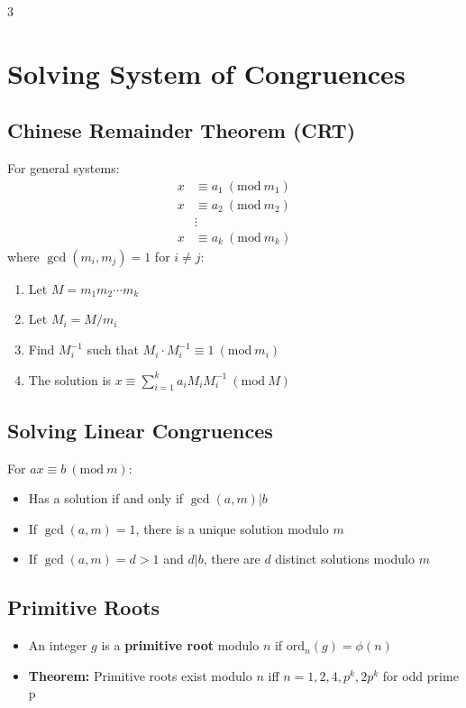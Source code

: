 \documentclass[8,a4paper]{article}
\newcommand{\ord}{\text{ord}}
\newcommand{\Mod}[1]{\ (\mathrm{mod}\ #1)}
\begin{document}
\begin{multicols}{3}
	\section{Solving System of Congruences}

	\subsection{Chinese Remainder Theorem (CRT)}
	For general systems:
	\begin{align*}
		x & \equiv a_1 \Mod{m_1} \\
		x & \equiv a_2 \Mod{m_2} \\
		  & \vdots               \\
		x & \equiv a_k \Mod{m_k}
	\end{align*}
	where $\gcd(m_i, m_j) = 1$ for $i \neq j$:

	\begin{enumerate}
		\item Let $M = m_1m_2\cdots m_k$
		\item Let $M_i = M/m_i$
		\item Find $M_i^{-1}$ such that $M_i \cdot M_i^{-1} \equiv 1 \Mod{m_i}$
		\item The solution is $x \equiv \sum_{i=1}^{k} a_i M_i M_i^{-1} \Mod{M}$
	\end{enumerate}

	\subsection{Solving Linear Congruences}
	For $ax \equiv b \Mod{m}$:
	\begin{itemize}[leftmargin=*]
		\item Has a solution if and only if $\gcd(a,m) | b$
		\item If $\gcd(a,m) = 1$, there is a unique solution modulo $m$
		\item If $\gcd(a,m) = d > 1$ and $d | b$, there are $d$ distinct solutions modulo $m$
	\end{itemize}

	\subsection{Primitive Roots}
	\begin{itemize}[leftmargin=*]
		\item An integer $g$ is a \textbf{primitive root} modulo $n$ if $\ord_n(g) = \phi(n)$
		\item \textbf{Theorem:} Primitive roots exist modulo $n$ iff $n = 1, 2, 4, p^k, 2p^k$ for odd prime p	\end{itemize}


\end{multicols}
\end{document}
